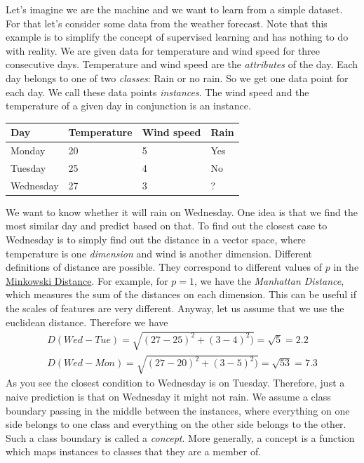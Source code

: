 \documentclass[10pt,a4paper]{article}
\begin{document}
Let's imagine we are the machine and we want to learn from a simple dataset.
For that let's consider some data from the weather forecast. Note that this example is to simplify the concept of supervised learning and has nothing to do with reality.
We are given data for temperature and wind speed for three consecutive days. Temperature and wind speed are the \textit{attributes} of the day. Each day belongs to one of two \textit{classes}: Rain or no rain. So we get one data point for each day. We call these data points \textit{instances}. The wind speed and the temperature of a given day in conjunction is an instance.


\begin{longtable}{|l|l|l|l|}
\hline
Day & Temperature & Wind speed & Rain \\ \hline

 Monday& 20 &5&Yes  \\ \hline
Tuesday & 25 & 4 &No\\ \hline
Wednesday &27  & 3&? \\ \hline
\end{longtable}
We want to know whether it will rain on Wednesday. One idea is that we find the most similar day and predict based on that. To find out the closest case to Wednesday is to simply find out the distance in a vector space, where temperature is one \textit{dimension} and wind is another dimension.
Different definitions of distance are possible. They correspond to different values of $p$ in the \href{https://en.wikipedia.org/wiki/Minkowski_distance}{Minkowski Distance}. For example, for $p=1$, we have the \textit{Manhattan Distance}, which measures the sum of the distances on each dimension. This can be useful if the scales of features are very different. Anyway, let us assume that we use the euclidean distance. Therefore we have
\begin{align}\nonumber
D(Wed-Tue)=\sqrt{(27-25)^2+(3-4)^2)}=\sqrt{5}=2.2\\
D(Wed-Mon)=\sqrt{(27-20)^2+(3-5)^2)}=\sqrt{53}=7.3
\end{align}
As you see the closest condition to Wednesday is on Tuesday. Therefore, just a naive prediction is that on Wednesday it might not rain. We assume a class boundary passing in the middle between the instances, where everything on one side belongs to one class and everything on the other side belongs to the other. Such a class boundary is called a \textit{concept}. More generally, a concept is a function which maps instances to classes that they are a member of. 
\end{document}
